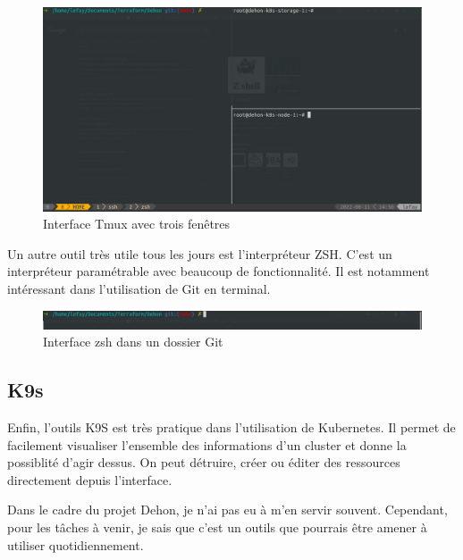 \documentclass[12pt]{article}
\begin{document}
\begin{figure}[!ht]
    \centering
        \includegraphics[width=\textwidth]{src/interface_tmux.png}
    \caption{Interface Tmux avec trois fenêtres}
    \label{fig:tmux}
\end{figure}

Un autre outil très utile tous les jours est l'interpréteur ZSH.
C'est un interpréteur paramétrable avec beaucoup de fonctionnalité.
Il est notamment intéressant dans l'utilisation de Git en terminal.

\begin{figure}[!ht]
    \centering
        \includegraphics[width=\textwidth]{src/interface_shell.png}
    \caption{Interface zsh dans un dossier Git}
    \label{fig:zsh}
\end{figure}

\newpage
\subsection{K9s}

Enfin, l'outils K9S est très pratique dans l'utilisation de \gls{Kubernetes}.
Il permet de facilement visualiser l'ensemble des informations d'un \gls{cluster} et donne la possiblité d'agir dessus.
On peut détruire, créer ou éditer des ressources directement depuis l'interface.

Dans le cadre du projet Dehon, je n'ai pas eu à m'en servir souvent.
Cependant, pour les tâches à venir, je sais que c'est un outils que pourrais être amener à utiliser quotidiennement.
\end{document}
